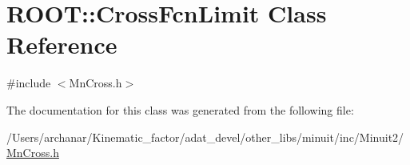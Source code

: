 \hypertarget{classROOT_1_1Minuit2_1_1MnCross_1_1CrossFcnLimit}{}\section{R\+O\+OT\+:\+:Cross\+Fcn\+Limit Class Reference}
\label{classROOT_1_1Minuit2_1_1MnCross_1_1CrossFcnLimit}


{\ttfamily \#include $<$Mn\+Cross.\+h$>$}



The documentation for this class was generated from the following file\+:\begin{DoxyCompactItemize}
\item 
/\+Users/archanar/\+Kinematic\+\_\+factor/adat\+\_\+devel/other\+\_\+libs/minuit/inc/\+Minuit2/\mbox{\hyperlink{other__libs_2minuit_2inc_2Minuit2_2MnCross_8h}{Mn\+Cross.\+h}}\end{DoxyCompactItemize}
